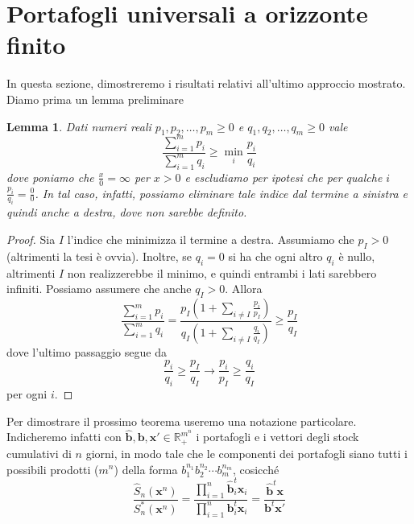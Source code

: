 \documentclass[a4paper,11pt]{book}
\theoremstyle{plain}
\newtheorem{lemma}[teo]{Lemma}
\theoremstyle{definition}
\theoremstyle{remark}
\newcommand{\R}{\mathbb{R}}
\newcommand{\x}{\bm{x}}
\newcommand{\B}{\bm{b}}
\newcommand{\bh}{\hat{\bm{b}}}
\newcommand{\Sh}{\hat{S}}
\begin{document}
\section{Portafogli universali a orizzonte finito}
In questa sezione, dimostreremo i risultati relativi all'ultimo approccio mostrato. Diamo prima un lemma preliminare
\begin{lemma}\label{lem:sum-min}
	Dati numeri reali $p_1,p_2,\ldots,p_m\geq 0$ e $q_1,q_2,\ldots,q_m\geq 0$ vale
	\begin{equation*}
		\frac{\sum_{i = 1}^{m}{p_i}}{\sum_{i = 1}^m{q_i}}\geq \min\limits_i\frac{p_i}{q_i}
	\end{equation*}
	dove poniamo che $\frac{x}{0} = \infty$ per $x>0$ e  escludiamo per ipotesi che per qualche $i$ $\frac{p_i}{q_i}=\frac{0}{0}$. In tal caso, infatti, possiamo eliminare tale indice dal termine a sinistra e quindi anche a destra, dove non sarebbe definito.
\end{lemma}
\begin{proof}
	Sia $I$ l'indice che minimizza il termine a destra. Assumiamo che $p_I>0$ (altrimenti la tesi è ovvia). Inoltre, se $q_i= 0$ si ha che ogni altro $q_i$ è nullo, altrimenti $I$ non realizzerebbe il minimo, e quindi entrambi i lati sarebbero infiniti. Possiamo assumere che anche $q_I>0$. Allora
	\begin{equation*}
		\frac{\sum_{i = 1}^{m}{p_i}}{\sum_{i = 1}^m{q_i}}=\frac{p_I (1+\sum_{i \neq I}{\frac{p_i}{p_I}})}{q_I(1+\sum_{i \neq I}{\frac{q_i}{q_I}})}\geq \frac{p_I}{q_I}
	\end{equation*}
	dove l'ultimo passaggio segue da
	\begin{equation*}
		\frac{p_i}{q_i}\geq \frac{p_I}{q_I}\longrightarrow \frac{p_i}{p_I}\geq \frac{q_i}{q_I}
	\end{equation*}
	per ogni $i$.
\end{proof}
Per dimostrare il prossimo teorema useremo una notazione particolare. Indicheremo infatti con $\bh,\B,\x'\in\R_+^{m^n}$ i portafogli e i vettori degli stock cumulativi di $n$ giorni, in modo tale che le componenti dei portafogli siano tutti i possibili prodotti ($m^n$) della forma $b_1^{n_1}b_2^{n_2}\cdots b_m^{n_m}$, cosicché
\begin{equation*}
				\frac{\Sh_n(\x^n)}{S_n^*(\x^n)}= \frac{\prod_{i = 1}^n{\bh_i^t\x_i}}{\prod_{i = 1}^n{\B^t_i\x_i}}=\frac{\bh^t\x}{\B^t\x'}
\end{equation*}
\end{document}
